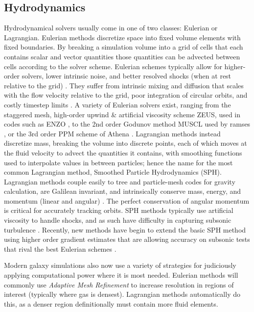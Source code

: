 \subsection{Hydrodynamics}
Hydrodynamical solvers usually come in one of two classes: Eulerian or
Lagrangian.  Eulerian methods discretize space into fixed volume elements with
fixed boundaries.  By breaking a simulation volume into a grid of cells that
each contains scalar and vector quantities those quantities can be advected
between cells according to the solver scheme.  Eulerian schemes typically allow
for higher-order solvers, lower intrinsic noise, and better resolved shocks
(when at rest relative to the grid) \citep{Teyssier2002,Stone2008,Bryan2014}.
They suffer from intrinsic mixing and diffusion that scales with the flow
velocity relative to the grid, poor integration of circular orbits, and costly
timestep limits \citep{Agertz2007,Tasker2008}.  A variety of Eulerian solvers
exist, ranging from the staggered mesh, high-order upwind \& artificial
viscosity scheme ZEUS, used in codes such as {\sc ENZO}
\citep{Stone1999,Bryan2014}, to the 2nd order Godunov method MUSCL used by {\sc
ramses} \citep{vanLeer1976,Teyssier2002}, or the 3rd order PPM scheme of {\sc
Athena} \citep{Stone2008}.  Lagrangian methods instead discretize mass, breaking
the volume into discrete points, each of which moves at the fluid
velocity to advect the quantities it contains, with smoothing functions used to
interpolate values in between particles; hence the name for the most common
Lagrangian method, Smoothed Particle Hydrodynamics (SPH).  Lagrangian methods
couple easily to tree and particle-mesh codes for gravity calculation, are
Galilean invariant, and intrinsically conserve mass, energy, and momentum
(linear and angular) \citep{Katz1996,Wadsley2004,Springel2005}.  The perfect
conservation of angular momentum is critical for accurately tracking orbits. SPH
methods typically use artificial viscosity to handle shocks, and as such have
difficulty in capturing subsonic turbulence \citep{Bauer2012}.  Recently, new
methods have begin to extend the basic SPH method using higher order gradient
estimates that are allowing accuracy on subsonic tests that rival the best
Eulerian schemes \citep{Springel2010,Hopkins2015,Valdarnini2016}. 

Modern galaxy simulations also now use a variety of strategies for judiciously
applying computational power where it is most needed.  Eulerian methods will
commonly use \textit{Adaptive Mesh Refinement} to increase resolution in regions
of interest (typically where gas is densest).  Lagrangian methods automatically
do this, as a denser region definitionally must contain more fluid elements.  

